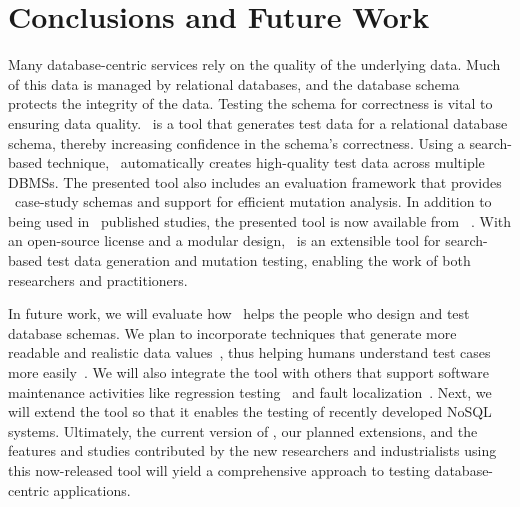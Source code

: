 
\section{Conclusions and Future Work}\label{sec:conclusion}


Many database-centric services rely on the quality of the underlying data. Much of this data is managed by relational
databases, and the database schema protects the integrity of the data. Testing the schema for correctness is vital to
ensuring data quality. \sa~is a tool that generates test data for a relational database schema, thereby increasing
confidence in the schema's correctness. Using a search-based technique, \sa~automatically creates high-quality test data
across multiple DBMSs. The presented tool also includes an evaluation framework that provides
\numprovidedschemas~case-study schemas and support for efficient mutation analysis. In addition to being used in
\numuniquepapers~published studies, the presented tool is now available from \sawebsite~\cite{tool}. With an open-source
license and a modular design, \sa~is an extensible tool for search-based test data generation and mutation testing,
enabling the work of both researchers and practitioners.


In future work, we will evaluate how \sa~helps the people who design and test database schemas.  We plan to
incorporate techniques that generate more readable and realistic data
values~\cite{Afshan2013,McMinn2012,Shahbaz2012,Shahbaz2015}, thus helping humans understand test cases more
easily~\cite{Fraser2015, Fraser2013}. We will also integrate the tool with others that support software maintenance
activities like regression testing~\cite{Kapfhammer2008} and fault localization~\cite{Clark2011}. Next, we will extend
the tool so that it enables the testing of recently developed NoSQL systems. Ultimately, the current version of \sa, our
planned extensions, and the features and studies contributed by the new researchers and industrialists using this
now-released tool will yield a comprehensive approach to testing database-centric applications.
